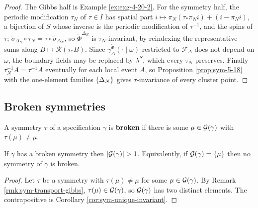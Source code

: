 \begin{proof}
    \leanok

    The Gibbs half is Example \ref{ex:exg-4-20-2}. For the symmetry half, the periodic
    modification $\tau_N$ of $\tau \in I$ has spatial part
    $i \mapsto \pi_N(\tau_* \pi_N i) + (i - \pi_N i)$, a bijection of $S$ whose inverse is the
    periodic modification of $\tau^{-1}$, and the spins of $\tau$;
    $\tilde\sigma_{\Delta_N} \circ \tau_N = \tau \circ \tilde\sigma_{\Delta_N}$, so
    $\tilde\Phi^{\Delta_N}$ is $\tau_N$-invariant, by reindexing the representative sums along
    $B \mapsto \mathcal{R}(\tau_* B)$. Since $\gamma^{\tilde\Phi}_{\Delta}(\cdot \mid \omega)$
    restricted to $\mathcal{F}_\Delta$ does not depend on $\omega$, the boundary fields may be
    replaced by $\lambda^S$, which every $\tau_N$ preserves. Finally $\tau_N^{-1}A = \tau^{-1}A$
    eventually for each local event $A$, so Proposition \ref{prop:sym-5-18} with the one-element
    families $\left\{ \Delta_N \right\}$ gives $\tau$-invariance of every cluster point.
\end{proof}

\subsection*{Broken symmetries}

\begin{definition}[Georgii (5.21)]
    \label{def:sym-broken}
    \leanok

    A symmetry $\tau$ of a specification $\gamma$ is \textbf{broken} if there is some
    $\mu \in \mathcal{G}(\gamma)$ with $\tau(\mu) \neq \mu$.
\end{definition}

\begin{theorem}
    \label{thm:sym-broken-nontrivial}
    \leanok

    If $\gamma$ has a broken symmetry then $|\mathcal{G}(\gamma)| > 1$. Equivalently, if
    $\mathcal{G}(\gamma) = \left\{ \mu \right\}$ then no symmetry of $\gamma$ is broken.
\end{theorem}
\begin{proof}
    \leanok

    Let $\tau$ be a symmetry with $\tau(\mu) \neq \mu$ for some $\mu \in \mathcal{G}(\gamma)$. By
    Remark \ref{rmk:sym-transport-gibbs}, $\tau(\mu) \in \mathcal{G}(\gamma)$, so $\mathcal{G}(\gamma)$
    has two distinct elements. The contrapositive is Corollary \ref{cor:sym-unique-invariant}.
\end{proof}


